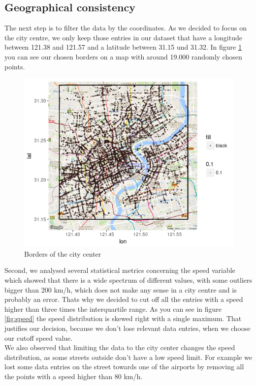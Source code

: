 \documentclass[11pt,conference,a4paper,onecolumn,romanappendices]{IEEEtran}
\begin{document}
\subsection{Geographical consistency}
The next step is to filter the data by the coordinates. As we decided to focus on the city centre, we only keep those entries in our dataset that have a longitude between 121.38 and 121.57 and a latitude between 31.15 und 31.32. In figure \ref{fig:borders} you can see our chosen borders on a map with around 19.000 randomly chosen points.\\
\begin{figure}[h]
\centering
\includegraphics[scale=0.9]{borders.png}
\caption{\label{fig:borders}Borders of the city center}
\end{figure}
Second, we analysed several statistical metrics concerning the speed variable which showed that there is a wide spectrum of different values, with some outliers bigger than 200 km/h, which does not make any sense in a city centre and is probably an error. Thats why we decided to cut off all the entries with a speed higher than three times the interquartile range. As you can see in figure \ref{fig:speed} the speed distribution is skewed right with a single maximum. That justifies our decision, because we don't lose relevant data entries, when we choose our cutoff speed value. \\
We also observed that limiting the data to the city center changes the speed distribution, as some streets outside don't have a low speed limit. For example we lost some data entries on the street towards one of the airports by removing all the points with a speed higher than 80 km/h. \\
\end{document}
